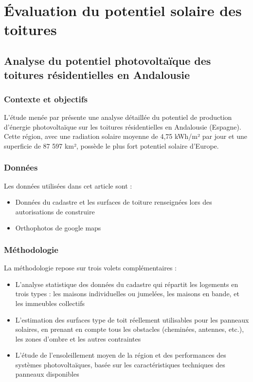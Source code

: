 \section{Évaluation du potentiel solaire des toitures}

\subsection{Analyse du potentiel photovoltaïque des toitures résidentielles en Andalousie}

\subsubsection{Contexte et objectifs}
\par{L'étude menée par \citeauthor{ordonez_analysis_2010} \cite{ordonez_analysis_2010} présente une analyse détaillée du potentiel de production d'énergie photovoltaïque sur les toitures résidentielles en Andalousie (Espagne). Cette région, avec une radiation solaire moyenne de 4,75 kWh/m² par jour et une superficie de 87 597 km², possède le plus fort potentiel solaire d'Europe.}

\subsubsection{Données}
\par{Les données utilisées dans cet article sont :}
\begin{itemize}
    \item Données du cadastre et les surfaces de toiture renseignées lors des autorisations de construire
    \item Orthophotos de google maps
\end{itemize}

\subsubsection{Méthodologie}
\par{La méthodologie repose sur trois volets complémentaires :}
\begin{itemize}
    \item L'analyse statistique des données du cadastre qui répartit les logements en trois types : les maisons individuelles ou jumelées, les maisons en bande, et les immeubles collectifs
    \item L'estimation des surfaces type de toit réellement utilisables pour les panneaux solaires, en prenant en compte tous les obstacles (cheminées, antennes, etc.), les zones d'ombre et les autres contraintes
    \item L'étude de l'ensoleillement moyen de la région et des performances des systèmes photovoltaïques, basée sur les caractéristiques techniques des panneaux disponibles
\end{itemize}


